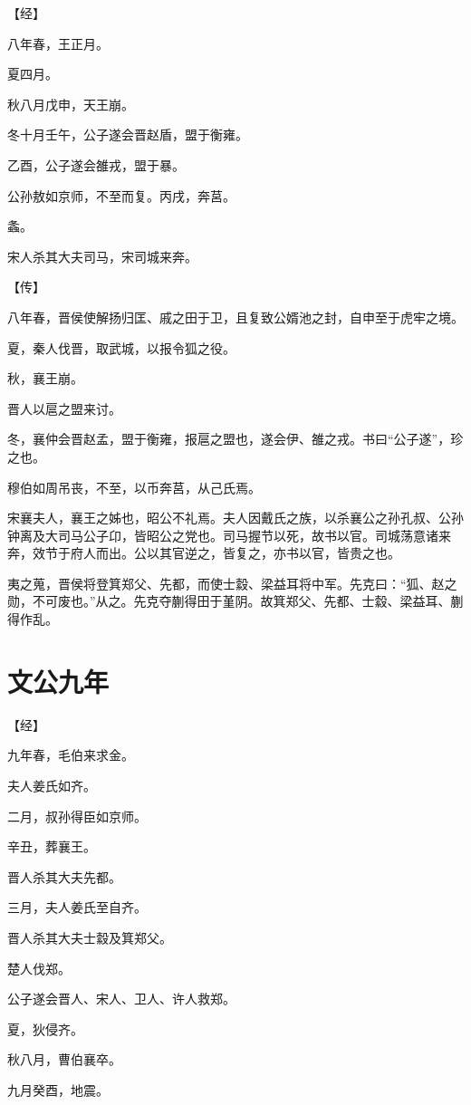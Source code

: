 \documentclass[a4paper,12pt,UTF8,twoside]{ctexbook}
\begin{document}
【经】

八年春，王正月。

夏四月。

秋八月戊申，天王崩。

冬十月壬午，公子遂会晋赵盾，盟于衡雍。

乙酉，公子遂会雒戎，盟于暴。

公孙敖如京师，不至而复。丙戌，奔莒。

螽。

宋人杀其大夫司马，宋司城来奔。

【传】

八年春，晋侯使解扬归匡、戚之田于卫，且复致公婿池之封，自申至于虎牢之境。

夏，秦人伐晋，取武城，以报令狐之役。

秋，襄王崩。

晋人以扈之盟来讨。

冬，襄仲会晋赵孟，盟于衡雍，报扈之盟也，遂会伊、雒之戎。书曰“公子遂”，珍之也。

穆伯如周吊丧，不至，以币奔莒，从己氏焉。

宋襄夫人，襄王之姊也，昭公不礼焉。夫人因戴氏之族，以杀襄公之孙孔叔、公孙钟离及大司马公子卬，皆昭公之党也。司马握节以死，故书以官。司城荡意诸来奔，效节于府人而出。公以其官逆之，皆复之，亦书以官，皆贵之也。

夷之蒐，晋侯将登箕郑父、先都，而使士縠、梁益耳将中军。先克曰：“狐、赵之勋，不可废也。”从之。先克夺蒯得田于堇阴。故箕郑父、先都、士縠、梁益耳、蒯得作乱。

\chapter{文公九年}



【经】

九年春，毛伯来求金。

夫人姜氏如齐。

二月，叔孙得臣如京师。

辛丑，葬襄王。

晋人杀其大夫先都。

三月，夫人姜氏至自齐。

晋人杀其大夫士縠及箕郑父。

楚人伐郑。

公子遂会晋人、宋人、卫人、许人救郑。

夏，狄侵齐。

秋八月，曹伯襄卒。

九月癸酉，地震。
\end{document}
